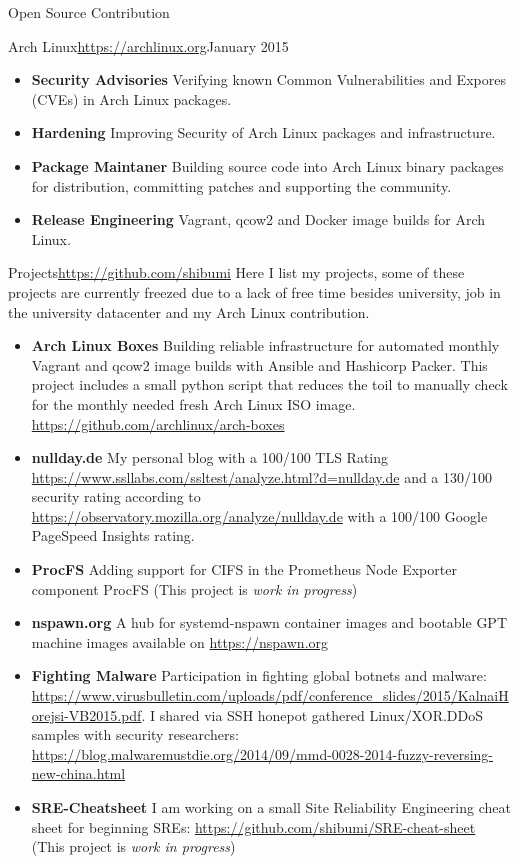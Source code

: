 \documentclass[]{mcdowellcv}
\begin{document}
\begin{cvsection}{Open Source Contribution}
\begin{cvsubsection}{Arch Linux}{\url{https://archlinux.org}}{January 2015}
\begin{itemize}
\item \textbf{Security Advisories} Verifying known Common Vulnerabilities and Expores (CVEs) in Arch Linux packages.
\item \textbf{Hardening} Improving Security of Arch Linux packages and infrastructure.
\item \textbf{Package Maintaner} Building source code into Arch Linux binary packages for distribution, committing patches and supporting the community.
\item \textbf{Release Engineering} Vagrant, qcow2 and Docker image builds for Arch Linux.
\end{itemize}
\end{cvsubsection}

\begin{cvsubsection}{Projects}{\url{https://github.com/shibumi}}{}
Here I list my projects, some of these projects are currently freezed due to a lack of free time besides university, job in the university datacenter and my Arch Linux contribution.
\begin{itemize}
\item \textbf{Arch Linux Boxes} Building reliable infrastructure for automated monthly Vagrant and qcow2 image builds with Ansible and Hashicorp Packer. This project includes a small python script that reduces the toil to manually check for the monthly needed fresh Arch Linux ISO image. \url{https://github.com/archlinux/arch-boxes}
\item \textbf{nullday.de} My personal blog with a 100/100 TLS Rating \url{https://www.ssllabs.com/ssltest/analyze.html?d=nullday.de} and a 130/100 security rating according to \url{https://observatory.mozilla.org/analyze/nullday.de} with a 100/100 Google PageSpeed Insights rating.
\item \textbf{ProcFS} Adding support for CIFS in the Prometheus Node Exporter component ProcFS (This project is \textit{work in progress})
\item \textbf{nspawn.org} A hub for systemd-nspawn container images and bootable GPT machine images available on \url{https://nspawn.org}
\item \textbf{Fighting Malware} Participation in fighting global botnets and malware: \url{https://www.virusbulletin.com/uploads/pdf/conference_slides/2015/KalnaiHorejsi-VB2015.pdf}. I shared via SSH honepot gathered Linux/XOR.DDoS samples with security researchers: \url{https://blog.malwaremustdie.org/2014/09/mmd-0028-2014-fuzzy-reversing-new-china.html}
\item \textbf{SRE-Cheatsheet} I am working on a small Site Reliability Engineering cheat sheet for beginning SREs: \url{https://github.com/shibumi/SRE-cheat-sheet} (This project is \textit{work in progress})
\end{itemize}
\end{cvsubsection}
\end{cvsection}
\end{document}
